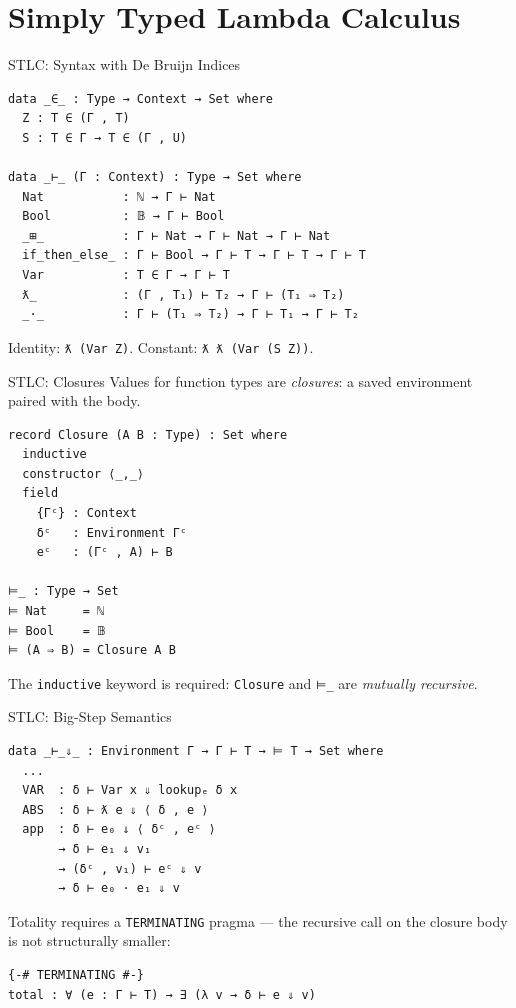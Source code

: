 \documentclass[10pt,compress,aspectratio=169]{beamer}
\begin{document}
\section{Simply Typed Lambda Calculus}

\begin{frame}[fragile]{STLC: Syntax with De Bruijn Indices}
\begin{verbatim}
data _∈_ : Type → Context → Set where
  Z : T ∈ (Γ , T)
  S : T ∈ Γ → T ∈ (Γ , U)

data _⊢_ (Γ : Context) : Type → Set where
  Nat           : ℕ → Γ ⊢ Nat
  Bool          : 𝔹 → Γ ⊢ Bool
  _⊞_           : Γ ⊢ Nat → Γ ⊢ Nat → Γ ⊢ Nat
  if_then_else_ : Γ ⊢ Bool → Γ ⊢ T → Γ ⊢ T → Γ ⊢ T
  Var           : T ∈ Γ → Γ ⊢ T
  ƛ_            : (Γ , T₁) ⊢ T₂ → Γ ⊢ (T₁ ⇒ T₂)
  _·_           : Γ ⊢ (T₁ ⇒ T₂) → Γ ⊢ T₁ → Γ ⊢ T₂
\end{verbatim}
  Identity: \texttt{ƛ (Var Z)}. \quad Constant: \texttt{ƛ ƛ (Var (S Z))}.
\end{frame}

\begin{frame}[fragile]{STLC: Closures}
  Values for function types are \emph{closures}: a saved environment paired with the body.

\begin{verbatim}
record Closure (A B : Type) : Set where
  inductive
  constructor ⟨_,_⟩
  field
    {Γᶜ} : Context
    δᶜ   : Environment Γᶜ
    eᶜ   : (Γᶜ , A) ⊢ B

⊨_ : Type → Set
⊨ Nat     = ℕ
⊨ Bool    = 𝔹
⊨ (A ⇒ B) = Closure A B
\end{verbatim}

  The \texttt{inductive} keyword is required: \texttt{Closure} and \texttt{⊨\_} are \emph{mutually recursive}.
\end{frame}

\begin{frame}[fragile]{STLC: Big-Step Semantics}
\begin{verbatim}
data _⊢_⇓_ : Environment Γ → Γ ⊢ T → ⊨ T → Set where
  ...
  VAR  : δ ⊢ Var x ⇓ lookupₑ δ x
  ABS  : δ ⊢ ƛ e ⇓ ⟨ δ , e ⟩
  app  : δ ⊢ e₀ ⇓ ⟨ δᶜ , eᶜ ⟩
       → δ ⊢ e₁ ⇓ v₁
       → (δᶜ , v₁) ⊢ eᶜ ⇓ v
       → δ ⊢ e₀ · e₁ ⇓ v
\end{verbatim}

  Totality requires a \texttt{TERMINATING} pragma — the recursive call on the closure body is not structurally smaller:
\begin{verbatim}
{-# TERMINATING #-}
total : ∀ (e : Γ ⊢ T) → ∃ (λ v → δ ⊢ e ⇓ v)
\end{verbatim}
\end{frame}
\end{document}
